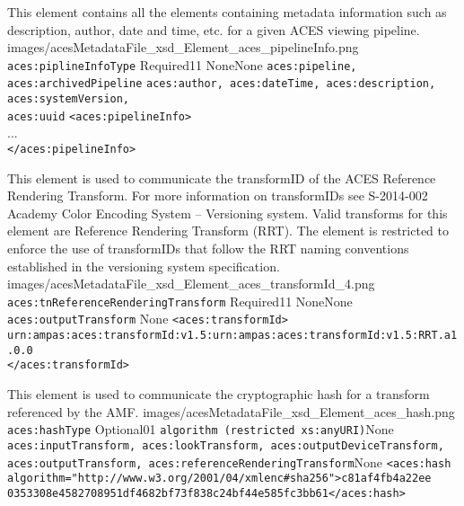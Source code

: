         {This element contains all the elements containing metadata information such as description, author, date and time, etc. for a given ACES viewing pipeline. }
        {images/acesMetadataFile_xsd_Element_aces_pipelineInfo.png}
        {\texttt{aces:piplineInfoType}}
        {Required}{1}{1}
        {None}{None}
        {\texttt{aces:pipeline, aces:archivedPipeline}}
        {\texttt{aces:author, aces:dateTime, aces:description, aces:systemVersion,\\ aces:uuid}}
        {\lstinline{<aces:pipelineInfo>} \\
        ... \\
        \lstinline{</aces:pipelineInfo>}}

        {This element is used to communicate the transformID of the ACES Reference Rendering Transform.  For more information on transformIDs see S-2014-002 Academy Color Encoding System -- Versioning system.  Valid transforms for this element are Reference Rendering Transform (RRT).  The element is restricted to enforce the use of transformIDs that follow the RRT naming conventions established in the versioning system specification.}
        {images/acesMetadataFile_xsd_Element_aces_transformId_4.png}
        {\texttt{aces:tnReferenceRenderingTransform}}
        {Required}{1}{1}
        {None}{None}
        {\texttt{aces:outputTransform}}
        {None}
        {\lstinline{<aces:transformId>}\\
        \lstinline{urn:ampas:aces:transformId:v1.5:urn:ampas:aces:transformId:v1.5:RRT.a1.0.0}\\
        \lstinline{</aces:transformId>}}

        {This element is used to communicate the cryptographic hash for a transform referenced by the AMF.}
        {images/acesMetadataFile_xsd_Element_aces_hash.png}
        {\texttt{aces:hashType}}
        {Optional}{0}{1}
        {\texttt{algorithm (restricted xs:anyURI)}}{None}
        {\texttt{aces:inputTransform, aces:lookTransform, aces:outputDeviceTransform,\\ aces:outputTransform, aces:referenceRenderingTransform}}{None}
        {
        \lstinline{<aces:hash algorithm="http://www.w3.org/2001/04/xmlenc#sha256">c81af4fb4a22ee}\\      \lstinline{0353308e4582708951df4682bf73f838c24bf44e585fc3bb61</aces:hash>}
        }

